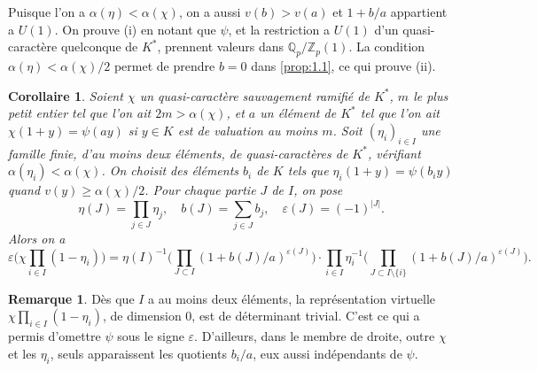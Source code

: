 \documentclass[12pt,a4paper]{article}
\theoremstyle{plain}
\newtheorem{corollary}[theorem]{Corollaire}
\theoremstyle{definition}
\newtheorem{remark}[theorem]{Remarque}
\theoremstyle{remark}
\newcommand{\bQ}{\mathbb{Q}}
\newcommand{\bZ}{\mathbb{Z}}
\begin{document}
Puisque l'on a $\alpha(\eta) < \alpha(\chi)$, on a aussi $v(b) > v(a)$ et $1+b/a$ appartient a $U(1)$. On prouve (i) en notant que $\psi$, et la restriction a $U(1)$ d'un quasi-caract\`ere quelconque de $K^*$, prennent valeurs dans $\bQ_p/\bZ_p(1)$. La condition $\alpha(\eta) < \alpha(\chi)/2$ permet de prendre $b = 0$ dans \ref{prop:1.1}, ce qui prouve (ii).

\begin{corollary}\label{cor:1.4}
Soient $\chi$ un quasi-caract\`ere sauvagement ramifi\'e de $K^*$, $m$ le plus petit entier tel que l'on ait $2m > \alpha(\chi)$, et $a$ un \'el\'ement de $K^*$ tel que l'on ait $\chi(1+y) = \psi(ay)$ si $y \in K$ est de valuation au moins $m$. Soit $(\eta_i)_{i \in I}$ une famille finie, d'au moins deux \'el\'ements, de quasi-caract\`eres de $K^*$, v\'erifiant $\alpha(\eta_i) < \alpha(\chi)$. On choisit des \'el\'ements $b_i$ de $K$ tels que $\eta_i(1+y) = \psi(b_i y)$ quand $v(y) \geq \alpha(\chi)/2$. Pour chaque partie $J$ de $I$, on pose
\[
\eta(J) = \prod_{j \in J} \eta_j, \quad b(J) = \sum_{j \in J} b_j, \quad \varepsilon(J) = (-1)^{|J|}.
\]
Alors on a
\begin{equation}\label{eq:1.4.1}
\varepsilon\biggl(\chi \prod_{i \in I}(1-\eta_i)\biggr) = \eta(I)^{-1}\biggl(\prod_{J \subset I} (1+b(J)/a)^{\varepsilon(J)}\biggr) \cdot \prod_{i \in I} \eta_i^{-1}\biggl(\prod_{J \subset I \setminus \{i\}} (1+b(J)/a)^{\varepsilon(J)}\biggr).
\end{equation}
\end{corollary}

\begin{remark}
D\`es que $I$ a au moins deux \'el\'ements, la repr\'esentation virtuelle $\chi \prod_{i \in I}(1-\eta_i)$, de dimension 0, est de d\'eterminant trivial. C'est ce qui a permis d'omettre $\psi$ sous le signe $\varepsilon$. D'ailleurs, dans le membre de droite, outre $\chi$ et les $\eta_i$, seuls apparaissent les quotients $b_i/a$, eux aussi ind\'ependants de $\psi$.
\end{remark}

\subsection{}
\label{sec:1.5}
\end{document}
